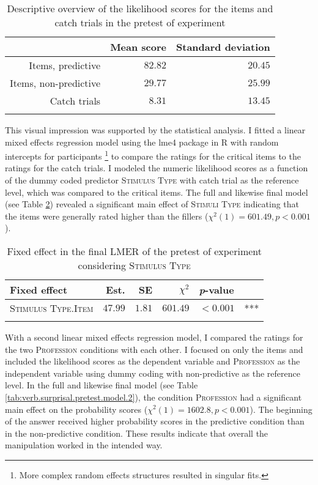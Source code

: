 \begin{table}
\caption{Descriptive overview of the likelihood scores for the items and catch trials in the pretest of experiment }
\centering
\begin{tabular}{rrr}
\lsptoprule
& \multicolumn{1}{c}{Mean score} & \multicolumn{1}{c}{Standard deviation} \\
\midrule
Items, predictive & $82.82$ & $20.45$ \\ 
Items, non-predictive & $29.77$ & $25.99$ \\ 
Catch trials & $8.31$ &	 $13.45$ \\ 
\lspbottomrule
\end{tabular}
\label{tab:verb.surprisal.pretest}
\end{table}

This visual impression was supported by the statistical analysis.
I fitted a linear mixed effects regression model using the lme4 package \citep{bates.etal2015} in R with random intercepts for participants%
\footnote{More complex random effects structures resulted in singular fits.}
%
to compare the ratings for the critical items to the ratings for the catch trials.
I modeled the numeric likelihood scores as a function of the dummy coded predictor \textsc{Stimulus Type} with catch trial as the reference level, which was compared to the critical items.
The full and likewise final model (see Table \ref{tab:verb.surprisal.pretest.model.1}) revealed a significant main effect of \textsc{Stimuli Type} indicating that the items were generally rated higher than the fillers ($\chi^2(1) = 601.49, p < 0.001$).

\begin{table}
\caption{Fixed effect in the final LMER of the pretest of experiment  considering \textsc{Stimulus Type}}
\centering
\begin{tabular}{lrrrll}
\lsptoprule
Fixed effect & Est. & SE & $\chi^2$ & \textit{p}-value &   \\
\midrule
\textsc{Stimulus Type.Item} & $47.99$ & $1.81$ & $601.49$ & $< 0.001$ & ***\\
\lspbottomrule
\end{tabular}
\label{tab:verb.surprisal.pretest.model.1}
\end{table}

With a second linear mixed effects regression model, I compared the ratings for the two \textsc{Profession} conditions with each other.
I focused on only the items and included the likelihood scores as the dependent variable and \textsc{Profession} as the independent variable using dummy coding with non-predictive as the reference level.
In the full and likewise final model (see Table \ref{tab:verb.surprisal.pretest.model.2}), the condition \textsc{Profession} had a significant main effect on the probability scores ($\chi^2(1) = 1602.8, p < 0.001$).
The beginning of the answer received higher probability scores in the predictive condition than in the non-predictive condition.
These results indicate that overall the manipulation worked in the intended way.

